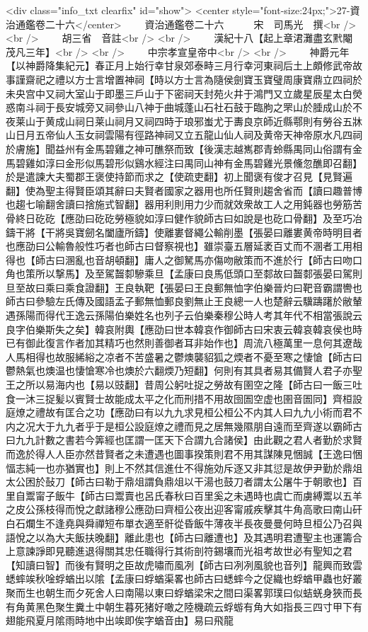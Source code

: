 <div class="info_txt clearfix" id="show">
<center style="font-size:24px;">27-資治通鑑卷二十六</center>
  　　資治通鑑卷二十六　　　宋　司馬光　撰<br />
<br />
　　胡三省　音註<br />
<br />
　　漢紀十八【起上章涒灘盡玄黓閹茂凡三年】<br />
<br />
　　中宗孝宣皇帝中<br />
<br />
　　神爵元年【以神爵降集紀元】春正月上始行幸甘泉郊泰畤三月行幸河東祠后土上頗修武帝故事謹齋祀之禮以方士言增置神祠【時以方士言為隨侯劍寶玉寶璧周康寶鼎立四祠於未央宫中又祠大室山于即墨三戶山于下密祠天封苑火井于鴻門又立歲星辰星太白熒惑南斗祠于長安城旁又祠參山八神于曲城蓬山石社石鼓于臨朐之罘山於腄成山於不夜莱山于黄成山祠日莱山祠月又祠四時于琅邪蚩尤于夀良京師近縣鄠則有勞谷五牀山日月五帝仙人玉女祠雲陽有徑路神祠又立五龍山仙人祠及黄帝天神帝原水凡四祠於膚施】聞益州有金馬碧雞之神可醮祭而致【後漢志越嶲郡青蛉縣禺同山俗謂有金馬碧雞如淳曰金形似馬碧形似鷄水經注曰禺同山神有金馬碧雞光景儵忽醮即召翻】於是遣諫大夫蜀郡王褒使持節而求之【使疏吏翻】初上聞褒有俊才召見【見賢遍翻】使為聖主得賢臣頌其辭曰夫賢者國家之器用也所任賢則趨舍省而【讀曰趣普博也趨七喻翻舍讀曰捨施式智翻】器用利則用力少而就效衆故工人之用鈍器也勞筋苦骨終日矻矻【應劭曰矻矻勞極貌如淳曰健作貌師古曰如說是也矻口骨翻】及至巧冶鑄干將【干將吳寶劒名闔廬所鑄】使離婁督繩公輸削墨【張晏曰離婁黄帝時明目者也應劭曰公輸魯般性巧者也師古曰督察視也】雖崇臺五層延袤百丈而不溷者工用相得也【師古曰溷亂也音胡頓翻】庸人之御駑馬亦傷吻敝策而不進於行【師古曰吻口角也策所以撃馬】及至駕齧厀驂乘旦【孟康曰良馬低頭口至䣛故曰齧䣛張晏曰駕則旦至故曰乘曰乘食證翻】王良執靶【張晏曰王良郵無恤字伯樂晉灼曰靶音霸謂轡也師古曰參驗左氏傳及國語孟子郵無恤郵良劉無止王良總一人也楚辭云驥躊躇於敝輦遇孫陽而得代王逸云孫陽伯樂姓名也列子云伯樂秦穆公時人考其年代不相當張說云良字伯樂斯失之矣】韓哀附輿【應劭曰世本韓哀作御師古曰宋衷云韓哀韓哀侯也時已有御此復言作者加其精巧也然則善御者耳非始作也】周流八極萬里一息何其遼哉人馬相得也故服絺綌之凉者不苦盛暑之鬱燠襲貂狐之煗者不憂至寒之悽愴【師古曰鬱熱氣也燠温也悽愴寒冷也燠於六翻煗乃短翻】何則有其具者易其備賢人君子亦聖王之所以易海内也【易以豉翻】昔周公躬吐捉之勞故有圉空之隆【師古曰一飯三吐食一沐三捉髪以賓賢士故能成太平之化而刑措不用故囹圄空虚也圉音圄同】齊桓設庭燎之禮故有匡合之功【應劭曰有以九九求見桓公桓公不内其人曰九九小術而君不内之况大于九九者乎于是桓公設庭燎之禮而見之居無幾隰朋自遠而至齊遂以霸師古曰九九計數之書若今筭經也匡謂一匡天下合謂九合諸侯】由此觀之君人者勤於求賢而逸於得人人臣亦然昔賢者之未遭遇也圖事揆策則君不用其謀陳見悃誠【王逸曰悃愊志純一也亦猶實也】則上不然其信進仕不得施効斥逐又非其愆是故伊尹勤於鼎俎太公困於鼔刀【師古曰勒于鼎俎謂負鼎俎以干湯也鼓刀者謂太公屠牛于朝歌也】百里自鬻甯子飯牛【師古曰鬻賣也呂氏春秋曰百里奚之未遇時也虞亡而虜縛鬻以五羊之皮公孫枝得而悅之獻諸穆公應劭曰齊桓公夜出迎客甯戚疾擊其牛角高歌曰南山矸白石爛生不逢堯與舜禪短布單衣適至骭從昏飯牛薄夜半長夜曼曼何時旦桓公乃召與語悅之以為大夫飯扶晚翻】離此患也【師古曰離遭也】及其遇明君遭聖主也運籌合上意諫諍即見聽進退得關其忠任職得行其術剖符錫壤而光祖考故世必有聖知之君【知讀曰智】而後有賢明之臣故虎嘯而風冽【師古曰冽冽風貌也音列】龍興而致雲蟋蟀竢秋唫蜉蝤出以隂【孟康曰蜉蝤渠畧也師古曰蟋蟀今之促織也蜉蝤甲蟲也好叢聚而生也朝生而夕死舍人曰南陽以東曰蜉蝤梁宋之間曰渠畧郭璞曰似蛣蜣身狹而長有角黄黑色聚生糞土中朝生暮死猪好噉之陸機疏云蜉蝣有角大如指長三四寸甲下有翅能飛夏月隂雨時地中出竢即俟字蝤音由】易曰飛龍